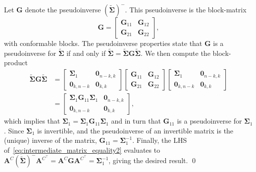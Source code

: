 \documentclass[12pt]{article}
\begin{document}
Let $\bm{G}$ denote the pseudoinverse $(\tilde{\bm{\Sigma}})^{-}$. This pseudoinverse is the block-matrix
\begin{equation}
    \bm{G} = 
    \begin{bmatrix}
        \bm{G}_{11} & \bm{G}_{12}\\
        \bm{G}_{21} & \bm{G}_{22} 
    \end{bmatrix},
\end{equation}
with conformable blocks. The pseudoinverse properties state that $\bm{G}$ is a pseudoinverse for $\tilde{\bm{\Sigma}}$ if and only if $\tilde{\bm{\Sigma}} = \tilde{\bm{\Sigma}} \bm{G} \tilde{\bm{\Sigma}}$. We then compute the block-product
\begin{equation}
\begin{split}
    \tilde{\bm{\Sigma}} \bm{G} \tilde{\bm{\Sigma}} 
    &= 
    \begin{bmatrix}
        \bm{\Sigma}_{1} & \bm{0}_{n-k, k} \\
        \bm{0}_{k, n-k} & \bm{0}_{k, k} 
    \end{bmatrix}
    \begin{bmatrix}
        \bm{G}_{11} & \bm{G}_{12}\\
        \bm{G}_{21} & \bm{G}_{22} 
    \end{bmatrix}
    \begin{bmatrix}
        \bm{\Sigma}_{1} & \bm{0}_{n-k, k} \\
        \bm{0}_{k, n-k} & \bm{0}_{k, k} 
    \end{bmatrix} \\
    &= 
    \begin{bmatrix}
        \bm{\Sigma}_1 \bm{G}_{11} \bm{\Sigma}_1 & \bm{0}_{n-k, k} \\
        \bm{0}_{k, n-k} & \bm{0}_{k, k} 
    \end{bmatrix}, 
\end{split}
\end{equation}
which implies that $\bm{\Sigma}_1 =  \bm{\Sigma}_1\bm{G}_{11} \bm{\Sigma}_1$ and in turn that $\bm{G}_{11}$ is a pseudoinverse for $\bm{\Sigma}_1$. Since $\bm{\Sigma}_1$ is invertible, and the pseudoinverse of an invertible matrix is the (unique) inverse of the matrix, $\bm{G}_{11} = \bm{\Sigma}_1^{-1}$. Finally, the LHS of~\eqref{eq:intermediate_matrix_equality2} evaluates to $\bm{A}^C(\tilde{\bm{\Sigma}})^{-}\bm{A}^{C^{\top}} = \bm{A}^C \bm{G} \bm{A}^{C^{\top}} = \bm{\Sigma}_1^{-1}$, giving the desired result. 
\qed
\end{document}

